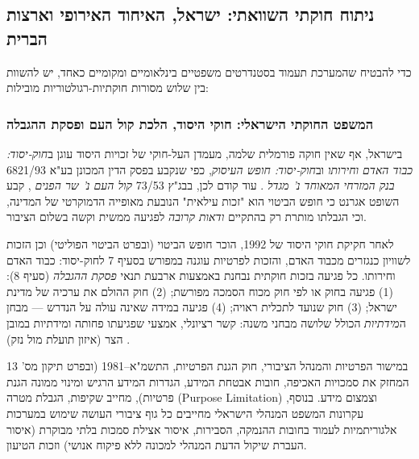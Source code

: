 \subsection{ניתוח חוקתי השוואתי: ישראל, האיחוד האירופי וארצות הברית}
כדי להבטיח שהמערכת תעמוד בסטנדרטים משפטיים בינלאומיים ומקומיים כאחד, יש להשוות בין שלוש מסורות חוקתיות-רגולטוריות מובילות:

\subsubsection{המשפט החוקתי הישראלי: חוקי היסוד, הלכת קול העם ופסקת ההגבלה}
בישראל, אף שאין חוקה פורמלית שלמה, מעמדן העל-חוקי של זכויות היסוד עוגן ב\emph{חוק-יסוד: כבוד האדם וחירותו} וב\emph{חוק-יסוד: חופש העיסוק}, כפי שנקבע בפסק הדין המכונן בע"א 6821/93 \emph{בנק המזרחי המאוחד נ' מגדל} \cite{mizrahi1995}. עוד קודם לכן, בבג"ץ 73/53 \emph{קול העם נ' שר הפנים} \cite{kolhaam1953}, קבע השופט אגרנט כי חופש הביטוי הוא "זכות עילאית" הנובעת מאופייה הדמוקרטי של המדינה, וכי הגבלתו מותרת רק בהתקיים \emph{ודאות קרובה} לפגיעה ממשית וקשה בשלום הציבור.

לאחר חקיקת חוקי היסוד של 1992, הוכר חופש הביטוי (ובפרט הביטוי הפוליטי) וכן הזכות לשוויון כנגזרים מכבוד האדם, והזכות לפרטיות עוגנה במפורש בסעיף 7 לחוק-יסוד: כבוד האדם וחירותו. כל פגיעה בזכות חוקתית נבחנת באמצעות ארבעת תנאי \emph{פסקת ההגבלה} (סעיף 8): (1) פגיעה בחוק או לפי חוק מכוח הסמכה מפורשת; (2) חוק ההולם את ערכיה של מדינת ישראל; (3) חוק שנועד לתכלית ראויה; (4) פגיעה במידה שאינה עולה על הנדרש --- מבחן ה\emph{מידתיות} הכולל שלושה מבחני משנה: קשר רציונלי, אמצעי שפגיעתו פחותה ומידתיות במובן הצר (איזון תועלת מול נזק) \cite{barak2012proportionality}.

במישור הפרטיות והמנהל הציבורי, חוק הגנת הפרטיות, התשמ"א--1981 (ובפרט תיקון מס' 13 המחזק את סמכויות האכיפה, חובות אבטחת המידע, הגדרות המידע הרגיש ומינוי ממונה הגנת פרטיות), מחייב שקיפות, הגבלת מטרה (Purpose Limitation) וצמצום מידע. בנוסף, עקרונות המשפט המנהלי הישראלי מחייבים כל גוף ציבורי העושה שימוש במערכות אלגוריתמיות לעמוד בחובות ההנמקה, הסבירות, איסור אצילת סמכות בלתי מבוקרת (איסור העברת שיקול הדעת המנהלי למכונה ללא פיקוח אנושי) וזכות הטיעון.

